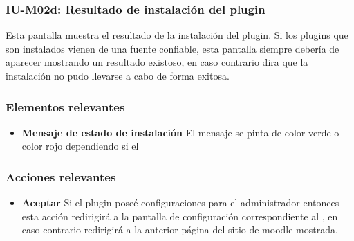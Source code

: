
\subsubsection{IU-M02d: Resultado de instalación del plugin}

 Esta pantalla muestra el resultado de la instalación del plugin. Si los plugins
 que son instalados vienen de una fuente confiable, esta pantalla siempre debería
 de aparecer mostrando un resultado existoso, en caso contrario dira que la instalación
 no pudo llevarse a cabo de forma exitosa.


\subsubsection{Elementos relevantes}

    \begin{itemize}
    \item {\bf Mensaje de estado de instalación}
        El mensaje se pinta de color verde o color rojo dependiendo si el 
    \end{itemize}

\subsubsection{Acciones relevantes}

    \begin{itemize}
    \item {\bf Aceptar}
        Si el plugin poseé configuraciones para el administrador entonces esta acción
        redirigirá a la pantalla de configuración correspondiente al ,
        en caso contrario redirigirá a la anterior página del sitio de moodle mostrada.
    \end{itemize}

\clearpage

